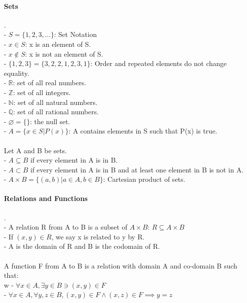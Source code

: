 \documentclass[10pt,letterpaper]{article}
\begin{document}
\begin{multicols}{2}

\paragraph*{Sets}.\\
- $S = \{1,2,3,\dots\}$: Set Notation\\
- $x \in S$: x is an element of S.\\
- $x \notin S$: x is not an element of S.\\
- $\{1,2,3\}=\{3,2,2,1,2,3,1\}$: Order and repeated elements do not change equality.\\
- $\mathbb{R}$: set of all real numbers.\\
- $\mathbb{Z}$: set of all integers.\\
- $\mathbb{N}$: set of all natural numbers.\\
- $\mathbb{Q}$: set of all rational numbers.\\
- $\varnothing = \{\}$: the null set.\\
- $A = \{x \in S | P(x)\}$: A contains elements in S such that P(x) is true.\\
\\
Let A and B be sets.\\
- $A \subseteq B$ if every element in A is in B.\\
- $A \subset B$ if every element in A is in B and at least one element in B is not in A.\\
- $A \times B = \{(a,b) | a \in A, b \in B\}$: Cartesian product of sets.

\paragraph*{Relations and Functions}.\\
- A relation R from A to B is a subset of $A \times B$: $R \subseteq A \times B$\\
- If $(x,y) \in R$, we say x is related to y by R.\\
- A is the domain of R and B is the codomain of R.\\
\\
A function F from A to B is a relation with domain A and co-domain B such that:\\w
- $\forall x \in A, \exists y \in B \ni (x,y) \in F$\\
- $\forall x \in A, \forall y,z \in B, (x,y) \in F \land (x,z) \in F \implies y=z$


\end{multicols}
\end{document}
